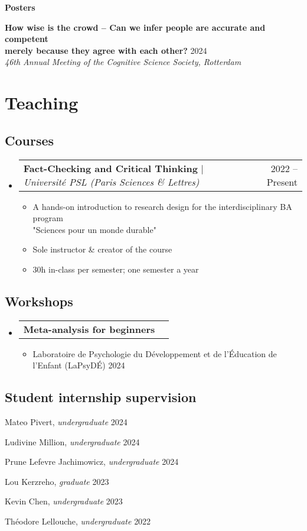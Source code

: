 \documentclass[letterpaper,11pt]{article}
\makeatletter
\newcommand{\resumeItem}[1]{
  \item\small{
    {#1 \vspace{-2pt}}
  }
}
\newcommand{\resumeItemWithYear}[3][ ]{ %
  \item\small{
    #2 \hfill {\small #3} \\
    #1
  }
}
\newcommand{\resumePublicationHeading}[1]{
  \vspace{5pt} %
  \noindent\textbf{\small #1} %
  \vspace{2pt} %
}
\newcommand{\resumeProjectHeading}[2]{
    \item
    \begin{tabular*}{0.97\textwidth}{l@{\extracolsep{\fill}}r}
      \small#1 & #2 \\
    \end{tabular*}\vspace{-7pt}
}
\newcommand{\resumeSubHeadingListStart}{\begin{itemize}[leftmargin=0.15in, label={}]}
\newcommand{\resumeSubHeadingListEnd}{\end{itemize}}
\newcommand{\resumeItemListStart}{\begin{itemize}}
\newcommand{\resumeItemListEnd}{\end{itemize}\vspace{-5pt}}
\makeatother
\begin{document}
\resumePublicationHeading{Posters}
\begin{enumerate}[label={[{\arabic*.}]}, left=0.15in, resume]
    \resumeItemWithYear{\textbf{How wise is the crowd -- Can we infer people are accurate and competent \\ merely because they agree with each other?}}{2024}{\textit{46th Annual Meeting of the Cognitive Science Society, Rotterdam}}
\end{enumerate}

\section{Teaching}

\subsection*{Courses}
    \resumeSubHeadingListStart
      \resumeProjectHeading
          {\textbf{Fact-Checking and Critical Thinking} $|$ \emph{Université PSL (Paris Sciences \& Lettres)}}{2022 -- Present}
          \resumeItemListStart
            \resumeItem{A hands-on introduction to research design for the interdisciplinary BA program \\ "Sciences pour un monde durable"}
            \resumeItem{Sole instructor \& creator of the course}
            \resumeItem{30h in-class per semester; one semester a year}
          \resumeItemListEnd
    \resumeSubHeadingListEnd

\subsection*{Workshops}
    \resumeSubHeadingListStart
      \resumeProjectHeading
          {\textbf{Meta-analysis for beginners}}{}
          \resumeItemListStart
          \resumeItemWithYear{Laboratoire de Psychologie du Développement et  de l'Éducation de l'Enfant (LaPsyDÉ)}{2024}
          \resumeItemListEnd
    \resumeSubHeadingListEnd

\subsection*{Student internship supervision}
\begin{enumerate}[label={[{\arabic*.}]}, left=0.15in]
    \resumeItemWithYear{Mateo Pivert, \textit{undergraduate}}{2024}
    \resumeItemWithYear{Ludivine Million, \textit{undergraduate}}{2024}
    \resumeItemWithYear{Prune Lefevre Jachimowicz, \textit{undergraduate}}{2024}
    \resumeItemWithYear{Lou Kerzreho, \textit{graduate}}{2023}
    \resumeItemWithYear{Kevin Chen, \textit{undergraduate}}{2023}
    \resumeItemWithYear{Théodore Lellouche, \textit{undergraduate}}{2022}
\end{enumerate}
\end{document}
